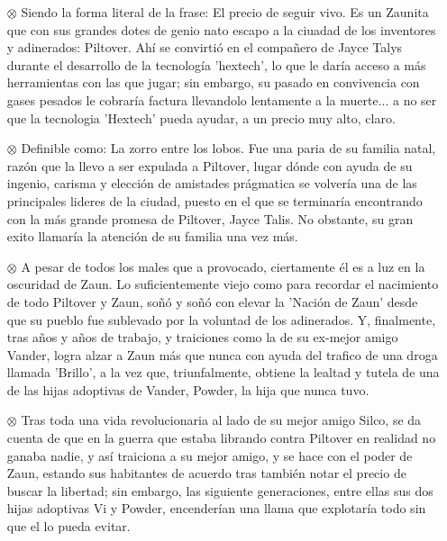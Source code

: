 \documentclass[11pt,a5paper]{article}
\begin{document}
\begin{itemize}
    \item[$\otimes$] {\textbf{}} Siendo la forma literal de la frase: El precio de seguir vivo. Es un Zaunita que con sus grandes dotes de genio nato escapo a la ciuadad de los inventores y adinerados: Piltover. Ahí se convirtió en el compañero de Jayce Talys durante el desarrollo de la tecnología 'hextech', lo que le daría acceso a más herramientas con las que jugar; sin embargo, su pasado en convivencia con gases pesados le cobraría factura llevandolo lentamente a la muerte... a no ser que la tecnologia 'Hextech' pueda ayudar, a un precio muy alto, claro.
    \item[$\otimes$] {\textbf{}} Definible como: La zorro entre los lobos. Fue una paria de su familia natal, razón que la llevo a ser expulada a Piltover, lugar dónde con ayuda de su ingenio, carisma y elección de amistades prágmatica se volvería una de las principales lideres de la ciudad, puesto en el que se terminaría encontrando con la más grande promesa de Piltover, Jayce Talis. No obstante, su gran exito llamaría la atención de su familia una vez más.
    \item[$\otimes$] {\textbf{}} A pesar de todos los males que a provocado, ciertamente él es a luz en la oscuridad de Zaun. Lo suficientemente viejo como para recordar el nacimiento de todo Piltover y Zaun, soñó y soñó con elevar la 'Nación de Zaun' desde que su pueblo fue sublevado por la voluntad de los adinerados. Y, finalmente, tras años y años de trabajo, y traiciones como la de su ex-mejor amigo Vander, logra alzar a Zaun más que nunca con ayuda del trafico de una droga llamada 'Brillo', a la vez que, triunfalmente, obtiene la lealtad y tutela de una de las hijas adoptivas de Vander, Powder, la hija que nunca tuvo.
    \item[$\otimes$] {\textbf{}} Tras toda una vida revolucionaria al lado de su mejor amigo Silco, se da cuenta de que en la guerra que estaba librando contra Piltover en realidad no ganaba nadie, y así traiciona a su mejor amigo, y se hace con el poder de Zaun, estando sus habitantes de acuerdo tras también notar el precio de buscar la libertad; sin embargo, las siguiente generaciones, entre ellas sus dos hijas adoptivas Vi y Powder, encenderían una llama que explotaría todo sin que el lo pueda evitar.
\end{itemize}
\end{document}
